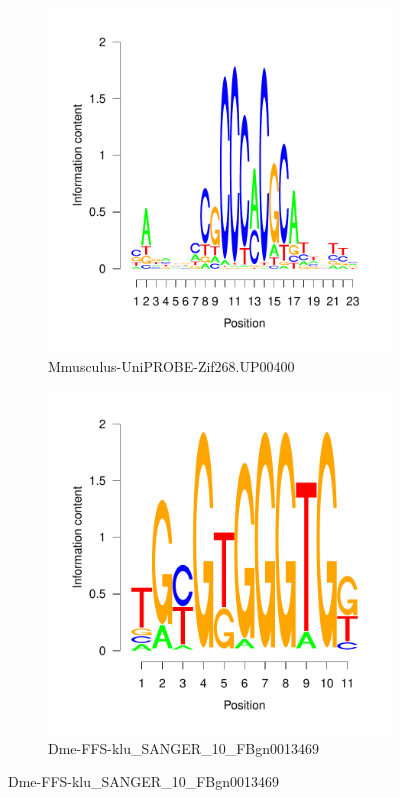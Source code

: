 \documentclass{article}
\begin{document}
\begin{figure}[htpb!]
  \centering
  \begin{subfigure}[b]{0.38\textwidth}
    \includegraphics[width=\textwidth]{MotifDb-logo3}
    \caption{Mmusculus-UniPROBE-Zif268.UP00400}
    \label{fig:Egr1-logo3}
    \end{subfigure}%
  \begin{subfigure}[b]{0.38\textwidth}
    \includegraphics[width=\textwidth]{MotifDb-logo4}
    \caption{Dme-FFS-klu\_SANGER\_10\_FBgn0013469}
    \label{fig:Egr1-logo4}
    \end{subfigure}%
\end{figure}
\end{document}
